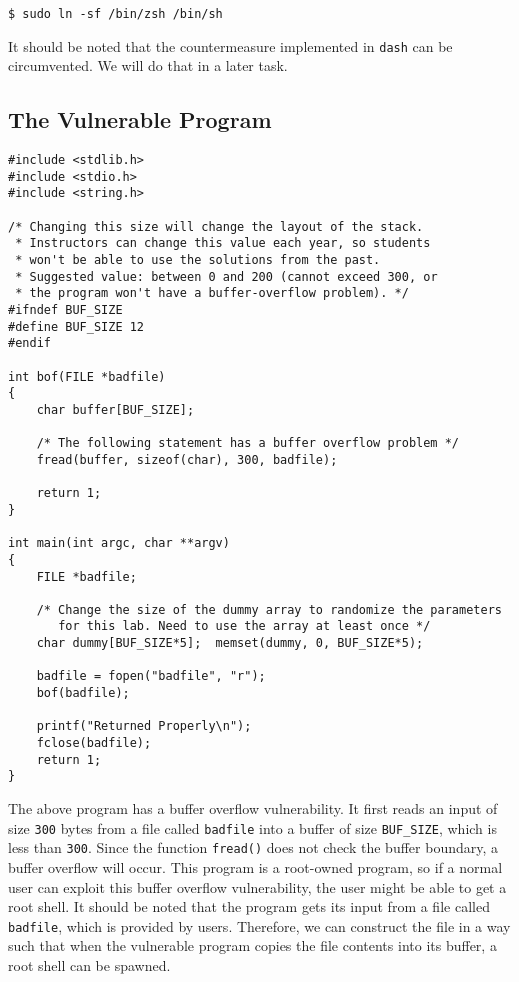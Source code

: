 \begin{lstlisting}
$ sudo ln -sf /bin/zsh /bin/sh
\end{lstlisting}


It should be noted that the countermeasure implemented in
\texttt{dash} can be circumvented. We will 
do that in a later task. 



\subsection{The Vulnerable Program}

\begin{lstlisting}[caption={The vulnerable program \texttt{retlib.c}}]
#include <stdlib.h>
#include <stdio.h>
#include <string.h>

/* Changing this size will change the layout of the stack.
 * Instructors can change this value each year, so students
 * won't be able to use the solutions from the past.
 * Suggested value: between 0 and 200 (cannot exceed 300, or 
 * the program won't have a buffer-overflow problem). */
#ifndef BUF_SIZE
#define BUF_SIZE 12 
#endif

int bof(FILE *badfile)
{
    char buffer[BUF_SIZE];

    /* The following statement has a buffer overflow problem */
    fread(buffer, sizeof(char), 300, badfile);

    return 1;
}

int main(int argc, char **argv)
{
    FILE *badfile;

    /* Change the size of the dummy array to randomize the parameters
       for this lab. Need to use the array at least once */
    char dummy[BUF_SIZE*5];  memset(dummy, 0, BUF_SIZE*5);

    badfile = fopen("badfile", "r");
    bof(badfile);

    printf("Returned Properly\n");
    fclose(badfile);
    return 1;
}
\end{lstlisting}


The above program has a buffer overflow vulnerability. It first reads
an input of size \texttt{300} bytes from a file called \texttt{badfile} into a buffer
of size \texttt{BUF\_SIZE}, which is less than \texttt{300}.
Since the function \texttt{fread()} does not check
the buffer boundary, a buffer overflow will occur.
This program is a root-owned \setuid program, so if a normal user can exploit this buffer
overflow vulnerability, the user might be able to get a root
shell.  It should be noted that the program gets its input from a file
called \texttt{badfile}, which is provided by users. Therefore, we can
construct the file in a way such that when
the vulnerable program copies the file contents into its buffer, a root
shell can be spawned. 



